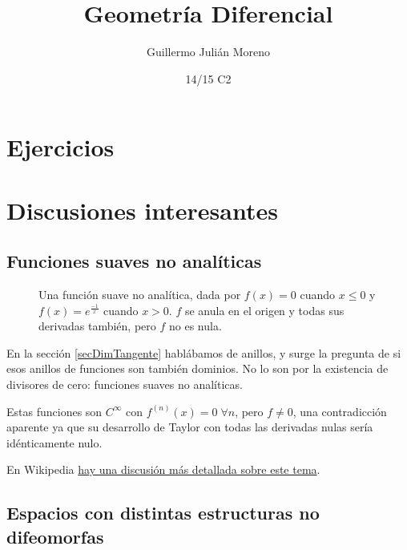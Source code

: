 \documentclass{apuntes}
\title{Geometría Diferencial}
\author{Guillermo Julián Moreno}
\date{14/15 C2}
\begin{document}
\pagestyle{plain}
\maketitle

\tableofcontents
\newpage








\appendix

\chapter{Ejercicios}


\chapter{Discusiones interesantes}

\section{Funciones suaves no analíticas}

\begin{figure}[hbtp]
\centering
{}
\caption{Una función suave no analítica, dada por $f(x) = 0$ cuando $x ≤ 0$ y $f(x) = e^{\frac{-1}{x}}$ cuando $x > 0$. $f$ se anula en el origen y todas sus derivadas también, pero $f$ no es nula.}
\end{figure}

En la sección \ref{secDimTangente} hablábamos de anillos, y surge la pregunta de si esos anillos de funciones son también dominios. No lo son por la existencia de divisores de cero: funciones suaves no analíticas.

Estas funciones son $C^∞$ con $f^{(n)}(x) = 0\; ∀n$, pero $f ≠ 0$, una contradicción aparente ya que su desarrollo de Taylor con todas las derivadas nulas sería idénticamente nulo.

En Wikipedia \href{http://en.wikipedia.org/wiki/Non-analytic_smooth_function}{hay una discusión más detallada sobre este tema}.

\section{Espacios con distintas estructuras no difeomorfas}
\label{secMismoEspacioNoDifeomorfo}
\end{document}
